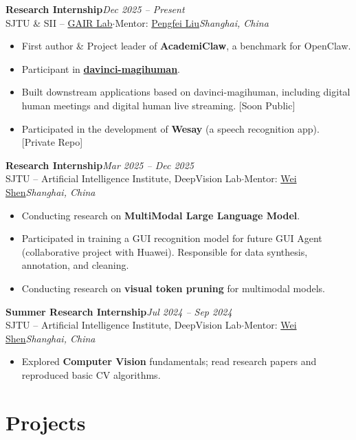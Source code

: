 \documentclass[11pt,a4paper]{article}
\newcommand{\entrysep}{\vspace{3pt}}
\newcommand{\entry}[4]{%
  \textbf{#1}\hfill{\color{muted}\textit{#2}}\\[-1pt]
  {\color{muted}#3}\hfill{\color{muted}\textit{#4}}\par\vspace{1pt}%
}
\begin{document}
\entry{Research Internship}{Dec 2025 -- Present}
{SJTU \& SII -- \href{https://plms.ai/index.html}{GAIR Lab}\enspace$\cdot$\enspace Mentor: \href{https://plms.ai/}{Pengfei Liu}}{Shanghai, China}
\begin{itemize}
  \item First author \& Project leader of \textbf{AcademiClaw}, a benchmark for OpenClaw.
  \item Participant in \href{https://huggingface.co/GAIR/daVinci-MagiHuman}{\textbf{davinci-magihuman}}.
  \item Built downstream applications based on davinci-magihuman, including digital human meetings and digital human live streaming. {\small\color{muted}[Soon Public]}
  \item Participated in the development of \textbf{Wesay} (a speech recognition app). {\small\color{muted}[Private Repo]}
\end{itemize}

\entrysep

\entry{Research Internship}{Mar 2025 -- Dec 2025}
{SJTU -- Artificial Intelligence Institute, DeepVision Lab\enspace$\cdot$\enspace Mentor: \href{https://shenwei1231.github.io/}{Wei Shen}}{Shanghai, China}
\begin{itemize}
  \item Conducting research on \textbf{MultiModal Large Language Model}.
  \item Participated in training a GUI recognition model for future GUI Agent (collaborative project with Huawei). Responsible for data synthesis, annotation, and cleaning.
  \item Conducting research on \textbf{visual token pruning} for multimodal models.
\end{itemize}

\entrysep

\entry{Summer Research Internship}{Jul 2024 -- Sep 2024}
{SJTU -- Artificial Intelligence Institute, DeepVision Lab\enspace$\cdot$\enspace Mentor: \href{https://shenwei1231.github.io/}{Wei Shen}}{Shanghai, China}
\begin{itemize}
  \item Explored \textbf{Computer Vision} fundamentals; read research papers and reproduced basic CV algorithms.
\end{itemize}

\section{Projects}
\end{document}
